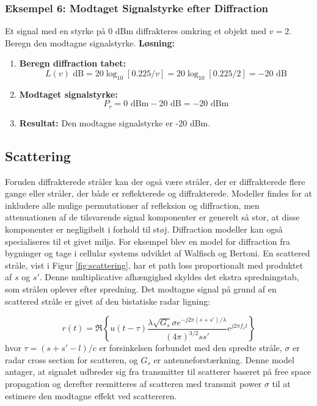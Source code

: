 \documentclass[a4paper,12pt]{book}
\begin{document}
	\subsubsection{Eksempel 6: Modtaget Signalstyrke efter Diffraction}
	\noindent Et signal med en styrke på 0 dBm diffrakteres omkring et objekt med \( v = 2 \). Beregn den modtagne signalstyrke.
	\newline\newline
	\noindent \textbf{Løsning:}
	\begin{enumerate}
		\item \textbf{Beregn diffraction tabet:} 
		\[
		L(v) \text{ dB} = 20 \log_{10}[0.225/v] = 20 \log_{10}[0.225/2] = -20 \text{ dB}
		\]
		\item \textbf{Modtaget signalstyrke:} 
		\[
		P_r = 0 \text{ dBm} - 20 \text{ dB} = -20 \text{ dBm}
		\]
		\item \textbf{Resultat:} Den modtagne signalstyrke er -20 dBm.
	\end{enumerate}
	
	\subsection{Scattering}
	\noindent Foruden diffrakterede stråler kan der også være stråler, der er diffrakterede flere gange eller stråler, der både er reflekterede og diffrakterede. Modeller findes for at inkludere alle mulige permutationer af refleksion og diffraction, men attenuationen af de tilsvarende signal komponenter er generelt så stor, at disse komponenter er negligibelt i forhold til støj. Diffraction modeller kan også specialiseres til et givet miljø. For eksempel blev en model for diffraction fra bygninger og tage i cellular systems udviklet af Walfisch og Bertoni. 
	\newline\newline\noindent En scattered stråle, vist i Figur \ref{fig:scattering}, har et path loss proportionalt med produktet af \( s \) og \( s' \). Denne multiplicative afhængighed skyldes det ekstra spredningstab, som strålen oplever efter spredning. Det modtagne signal på grund af en scattered stråle er givet af den bistatiske radar ligning:

	\[
	r(t) = \Re \left\{ u(t - \tau) \frac{\lambda \sqrt{G_s} \sigma e^{-j2\pi(s+s')/\lambda}}{(4\pi)^{3/2}ss'} e^{j2\pi f_c t} \right\}
	\]
	\noindent hvor \( \tau = (s + s' - l)/c \) er forsinkelsen forbundet med den spredte stråle, \( \sigma \) er radar cross section for scatteren, og \( G_s \) er antenneforstærkning. Denne model antager, at signalet udbreder sig fra transmitter til scatterer baseret på free space propagation og derefter reemitteres af scatteren med transmit power \( \sigma \) til at estimere den modtagne effekt ved scattereren.
	
\end{document}
